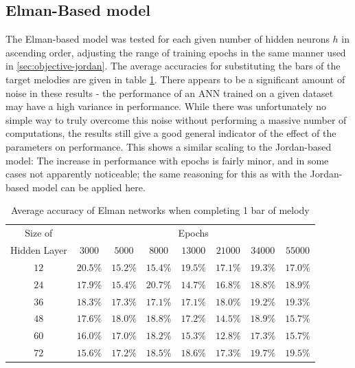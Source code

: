\documentclass[ author={Stephen Livermore-Tozer},
				supervisor={Dr. Peter Flach},
				degree={MEng},
				title={Algorithmic Co-composition Using Machine Learning},
				subtitle={},
				type={research},
				year={2016} ]{dissertation}
\begin{document}
	\subsection{Elman-Based model}
	\label{sec:objective-elman}
	
	The Elman-based model was tested for each given number of hidden neurons $h$ in ascending order, adjusting the range of training epochs in the same manner used in \ref{sec:objective-jordan}. The average accuracies for substituting the bars of the target melodies are given in table \ref{tab:elman-1-bar-results}. There appears to be a significant amount of noise in these results - the performance of an ANN trained on a given dataset may have a high variance in performance. While there was unfortunately no simple way to truly overcome this noise without performing a massive number of computations, the results still give a good general indicator of the effect of the parameters on performance. This shows a similar scaling to the Jordan-based model: The increase in performance with epochs is fairly minor, and in some cases not apparently noticeable; the same reasoning for this as with the Jordan-based model can be applied here.
	
	\begin{table}[htp]
		\begin{center}
			\begin{tabular}{cccccccc}
				\toprule
				Size of& \multicolumn{7}{c}{Epochs}\\
				\cline{2-8}
				Hidden Layer& $3000$ & $5000$ & $8000$ & $13000$ & $21000$ & $34000$ & $55000$\\
				\hline
				$12$ & $20.5\%$ & $15.2\%$ & $15.4\%$ & $19.5\%$ & $17.1\%$ & $19.3\%$ & $17.0\%$\\
				$24$ & $17.9\%$ & $15.4\%$ & $20.7\%$ & $14.7\%$ & $16.8\%$ & $18.8\%$ & $18.9\%$\\
				$36$ & $18.3\%$ & $17.3\%$ & $17.1\%$ & $17.1\%$ & $18.0\%$ & $19.2\%$ & $19.3\%$\\
				$48$ & $17.6\%$ & $18.0\%$ & $18.8\%$ & $17.2\%$ & $14.5\%$ & $18.9\%$ & $15.7\%$\\
				$60$ & $16.0\%$ & $17.0\%$ & $18.2\%$ & $15.3\%$ & $12.8\%$ & $17.3\%$ & $15.7\%$\\
				$72$ & $15.6\%$ & $17.2\%$ & $18.5\%$ & $18.6\%$ & $17.3\%$ & $19.7\%$ & $19.5\%$\\
				\bottomrule
			\end{tabular}
		\end{center}
		\caption{Average accuracy of Elman networks when completing 1 bar of melody}
		\label{tab:elman-1-bar-results}
	\end{table}
	
\end{document}
